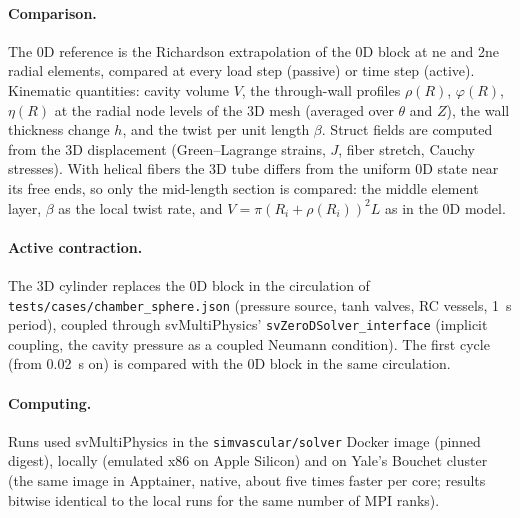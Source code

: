 \paragraph{Comparison.} The 0D reference is the Richardson extrapolation of the 0D
block at ne and 2ne radial elements, compared at every load step (passive) or time step
(active). Kinematic quantities: cavity volume $V$, the through-wall profiles
$\rho(R)$, $\varphi(R)$, $\eta(R)$ at the radial node levels of the 3D mesh (averaged
over $\theta$ and $Z$), the wall thickness change $h$, and the twist per unit length
$\beta$. Struct fields are computed from the 3D displacement (Green--Lagrange strains,
$J$, fiber stretch, Cauchy stresses). With helical fibers the 3D tube differs from the
uniform 0D state near its free ends, so only the mid-length section is compared: the
middle element layer, $\beta$ as the local twist rate, and $V = \pi(R_i + \rho(R_i))^2 L$
as in the 0D model.

\paragraph{Active contraction.} The 3D cylinder replaces the 0D block in the circulation
of \texttt{tests/cases/chamber\_sphere.json} (pressure source, tanh valves, RC vessels,
1~s period), coupled through svMultiPhysics' \texttt{svZeroDSolver\_interface}
(implicit coupling, the cavity pressure as a coupled Neumann condition). The first
cycle (from 0.02~s on) is compared with the 0D block in the same circulation.

\paragraph{Computing.} Runs used svMultiPhysics in the \texttt{simvascular/solver} Docker
image (pinned digest), locally (emulated x86 on Apple Silicon) and on Yale's Bouchet
cluster (the same image in Apptainer, native, about five times faster per core;
results bitwise identical to the local runs for the same number of MPI ranks).
